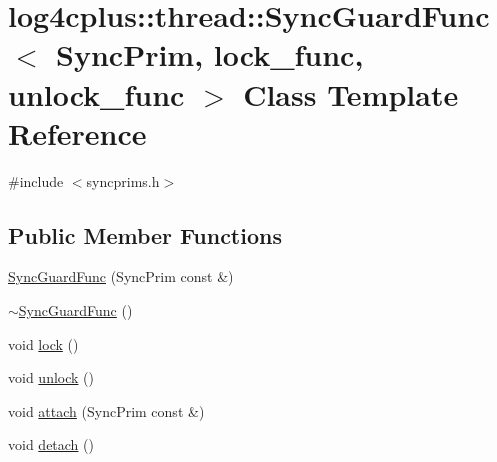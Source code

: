 \hypertarget{classlog4cplus_1_1thread_1_1SyncGuardFunc}{\section{log4cplus\-:\-:thread\-:\-:Sync\-Guard\-Func$<$ Sync\-Prim, lock\-\_\-func, unlock\-\_\-func $>$ Class Template Reference}
\label{classlog4cplus_1_1thread_1_1SyncGuardFunc}
}


{\ttfamily \#include $<$syncprims.\-h$>$}

\subsection*{Public Member Functions}
\begin{DoxyCompactItemize}
\item 
\hyperlink{classlog4cplus_1_1thread_1_1SyncGuardFunc_a0145816618d16886d1fb34cf88a8f2f9}{Sync\-Guard\-Func} (Sync\-Prim const \&)
\item 
\hyperlink{classlog4cplus_1_1thread_1_1SyncGuardFunc_a4e0678f065f8af49237189626bcfa278}{$\sim$\-Sync\-Guard\-Func} ()
\item 
void \hyperlink{classlog4cplus_1_1thread_1_1SyncGuardFunc_a38e1065c2d2008a9c6973c4599513fb8}{lock} ()
\item 
void \hyperlink{classlog4cplus_1_1thread_1_1SyncGuardFunc_abcee17e3548e870835135c008cd860d9}{unlock} ()
\item 
void \hyperlink{classlog4cplus_1_1thread_1_1SyncGuardFunc_a4afbb65e3af117e67eb72b4771bebb39}{attach} (Sync\-Prim const \&)
\item 
void \hyperlink{classlog4cplus_1_1thread_1_1SyncGuardFunc_a0de186114a5ff59a143fb153bbf72353}{detach} ()
\end{DoxyCompactItemize}


